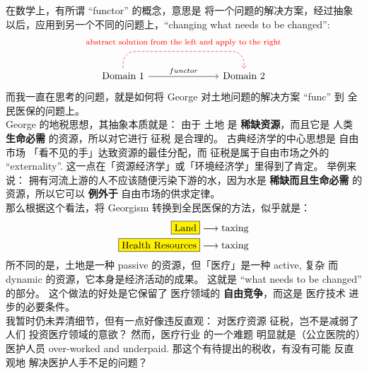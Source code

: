 \begin{preview}
\begin{minipage}{\textwidth}
在数学上，有所谓 ``functor'' 的概念，意思是 将一个问题的解决方案，经过抽象以后，应用到另一个不同的问题上，``changing what needs to be changed'':
\begin{equation}
\begin{tikzcd}[column sep=2.5cm, row sep=2cm]
\mbox{\cc{问题}{Domain} 1} \arrow[r, "functor"]
\arrow[r, to path={ -- ([yshift=4ex]\tikztostart.north) -| (\tikztotarget)},
rounded corners=12pt, dashed, red]
\ar[phantom]{r}[yshift=8ex]{\footnotesize{\mbox{\color{red}\cc{将左边的解决方案，经过抽象后，应用到右边}{abstract solution from the left and apply to the right}}}}
& \mbox{\cc{问题}{Domain} 2}
\end{tikzcd}
\nonumber
\end{equation}
而我一直在思考的问题，就是如何将 George 对土地问题的解决方案 ``func'' 到 全民医保的问题上。 \\

George 的地税思想，其抽象本质就是： 由于 土地 是 \textbf{稀缺资源}，而且它是 人类 \textbf{生命必需} 的资源，所以对它进行 征税 是合理的。 古典经济学的中心思想是 自由市场 「看不见的手」达致资源的最佳分配，而 征税是属于自由市场之外的 ``externality''.  这一点在「资源经济学」或「环境经济学」里得到了肯定。 举例来说： 拥有河流上游的人不应该随便污染下游的水，因为水是 \textbf{稀缺而且生命必需} 的资源，所以它可以 \textbf{例外于} 自由市场的供求定律。\\

那么根据这个看法，将 Georgism 转换到全民医保的方法，似乎就是：
\begin{eqnarray}
	\fcolorbox{black}{yellow}{\mbox{\cc{土地}{Land}}} & \longrightarrow \mbox{\cc{征税}{taxing}} \nonumber \\
	\fcolorbox{black}{yellow}{\mbox{\cc{医疗资源}{Health Resources}}} & \longrightarrow \mbox{\cc{征税}{taxing}} \nonumber
\end{eqnarray}
所不同的是，土地是一种 passive 的资源，但「医疗」是一种 active, 复杂 而 dynamic 的资源，它本身是经济活动的成果。 这就是 ``what needs to be changed'' 的部分。 这个做法的好处是它保留了 医疗领域的 \textbf{自由竞争}，而这是 医疗技术 进步的必要条件。\\

我暂时仍未弄清细节，但有一点好像违反直观： 对医疗资源 征税，岂不是减弱了人们 投资医疗领域的意欲？ 然而，医疗行业 的一个难题 明显就是（公立医院的）医护人员 over-worked and underpaid.  那这个有待提出的税收，有没有可能 反直观地 解决医护人手不足的问题？\\


\end{minipage}
\end{preview}
